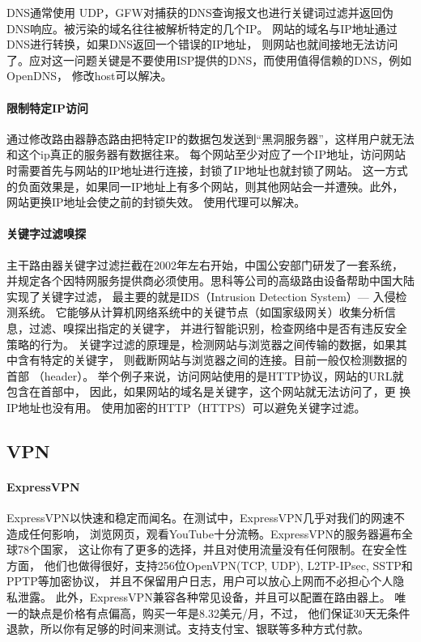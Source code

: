 \documentclass{book}
\begin{document}
DNS通常使用 UDP，GFW对捕获的DNS查询报文也进行关键词过滤并返回伪DNS响应。被污染的域名往往被解析特定的几个IP。
网站的域名与IP地址通过DNS进行转换，如果DNS返回一个错误的IP地址，
则网站也就间接地无法访问了。应对这一问题关键是不要使用ISP提供的DNS，而使用值得信赖的DNS，例如OpenDNS，
修改host可以解决。

\paragraph{限制特定IP访问}

通过修改路由器静态路由把特定IP的数据包发送到“黑洞服务器”，这样用户就无法和这个ip真正的服务器有数据往来。
每个网站至少对应了一个IP地址，访问网站时需要首先与网站的IP地址进行连接，封锁了IP地址也就封锁了网站。
这一方式的负面效果是，如果同一IP地址上有多个网站，则其他网站会一并遭殃。此外，网站更换IP地址会使之前的封锁失效。
使用代理可以解决。

\paragraph{关键字过滤嗅探}
主干路由器关键字过滤拦截在2002年左右开始，中国公安部门研发了一套系统，
并规定各个因特网服务提供商必须使用。思科等公司的高级路由设备帮助中国大陆实现了关键字过滤，
最主要的就是IDS（Intrusion Detection System）— 入侵检测系统。
它能够从计算机网络系统中的关键节点（如国家级网关）收集分析信息，过滤、嗅探出指定的关键字，
并进行智能识别，检查网络中是否有违反安全策略的行为。
关键字过滤的原理是，检测网站与浏览器之间传输的数据，如果其中含有特定的关键字，
则截断网站与浏览器之间的连接。目前一般仅检测数据的首部 （header）。
举个例子来说，访问网站使用的是HTTP协议，网站的URL就包含在首部中，
因此，如果网站的域名是关键字，这个网站就无法访问了，更 换IP地址也没有用。
使用加密的HTTP（HTTPS）可以避免关键字过滤。

\subsection{VPN}

\paragraph{ExpressVPN}
ExpressVPN以快速和稳定而闻名。在测试中，ExpressVPN几乎对我们的网速不造成任何影响，
浏览网页，观看YouTube十分流畅。ExpressVPN的服务器遍布全球78个国家，
这让你有了更多的选择，并且对使用流量没有任何限制。在安全性方面，
他们也做得很好，支持256位OpenVPN(TCP, UDP), L2TP-IPsec, SSTP和PPTP等加密协议，
并且不保留用户日志，用户可以放心上网而不必担心个人隐私泄露。
此外，ExpressVPN兼容各种常见设备，并且可以配置在路由器上。
唯一的缺点是价格有点偏高，购买一年是8.32美元/月，不过，
他们保证30天无条件退款，所以你有足够的时间来测试。支持支付宝、银联等多种方式付款。
\end{document}
